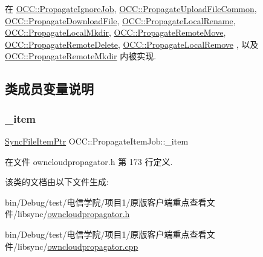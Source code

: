 在 \hyperlink{class_o_c_c_1_1_propagate_ignore_job_ab4b6fd1aeabf3279ac136719dc3cf6fb}{O\+C\+C\+::\+Propagate\+Ignore\+Job}, \hyperlink{class_o_c_c_1_1_propagate_upload_file_common_a588514bbae3f7655a7b9dba85fb6af62}{O\+C\+C\+::\+Propagate\+Upload\+File\+Common}, \hyperlink{class_o_c_c_1_1_propagate_download_file_ade2a2624bf1c87f82d032d1d60790352}{O\+C\+C\+::\+Propagate\+Download\+File}, \hyperlink{class_o_c_c_1_1_propagate_local_rename_a9c4741f660f381d80ca02fa886b4aec2}{O\+C\+C\+::\+Propagate\+Local\+Rename}, \hyperlink{class_o_c_c_1_1_propagate_local_mkdir_abfc04efdcf2e09708c31531c2527a767}{O\+C\+C\+::\+Propagate\+Local\+Mkdir}, \hyperlink{class_o_c_c_1_1_propagate_remote_move_a2cd9e57f880e1e408c27fad40cdeaf70}{O\+C\+C\+::\+Propagate\+Remote\+Move}, \hyperlink{class_o_c_c_1_1_propagate_remote_delete_afa9cfbdf647e648209af60ef224216b9}{O\+C\+C\+::\+Propagate\+Remote\+Delete}, \hyperlink{class_o_c_c_1_1_propagate_local_remove_af810729c9c8ca5d51d1ad019d27f6909}{O\+C\+C\+::\+Propagate\+Local\+Remove} , 以及 \hyperlink{class_o_c_c_1_1_propagate_remote_mkdir_a9bc9722b6554147bdb84d65effe15dee}{O\+C\+C\+::\+Propagate\+Remote\+Mkdir} 内被实现.



\subsection{类成员变量说明}
\mbox{\label{class_o_c_c_1_1_propagate_item_job_a3ea41be5747457782c94342f22a5857d}} 
\subsubsection{\texorpdfstring{\+\_\+item}{\_item}}
{\footnotesize\ttfamily \hyperlink{namespace_o_c_c_acb6b0db82893659fbd0c98d3c5b8e2b8}{Sync\+File\+Item\+Ptr} O\+C\+C\+::\+Propagate\+Item\+Job\+::\+\_\+item}



在文件 owncloudpropagator.\+h 第 173 行定义.



该类的文档由以下文件生成\+:\begin{DoxyCompactItemize}
\item 
bin/\+Debug/test/电信学院/项目1/原版客户端重点查看文件/libsync/\hyperlink{owncloudpropagator_8h}{owncloudpropagator.\+h}\item 
bin/\+Debug/test/电信学院/项目1/原版客户端重点查看文件/libsync/\hyperlink{owncloudpropagator_8cpp}{owncloudpropagator.\+cpp}\end{DoxyCompactItemize}
